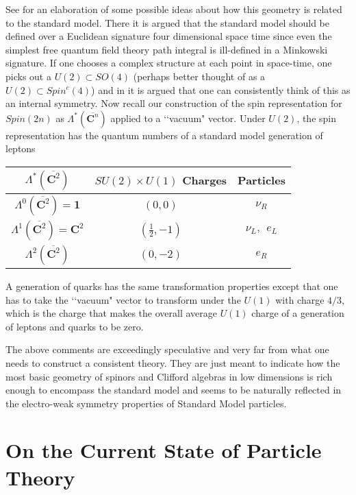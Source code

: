 \documentclass[a4paper,a4paper]{article}
\theoremstyle{conjecture}
\begin{document}
See \cite{Woit1} for an elaboration of some possible ideas about how this geometry
is related to the standard model.  There it is argued that
the standard model should be defined over a Euclidean signature four dimensional
space time since even the simplest free quantum field theory path integral is ill-defined
in a Minkowski signature.  If one chooses a complex structure at each point in space-time,
one picks out a $U(2)\subset SO(4)$ (perhaps better thought of as a $U(2)\subset Spin^c(4)$) 
and in \cite{Woit1} it is argued that one can
consistently think of this as an internal symmetry.  Now recall our construction of
the spin representation for $Spin(2n)$ as $\Lambda^*(\overline {\mathbf C^n})$ applied to a \lq\lq vacuum"
vector.  Under $U(2)$, the spin representation has the quantum numbers of a standard model generation
of leptons

\begin{center}
\begin{tabular}{|c|c|c|}
\hline
$\Lambda^*(\overline{\mathbf C^2})$ & $SU(2)\times U(1)$ Charges& Particles \\
\hline
\hline
$\Lambda^0(\overline{\mathbf C^2})=\mathbf 1$ & $(0,0)$& $\nu_R$\\
\hline
$\Lambda^1(\overline{\mathbf C^2})=\mathbf C^2$ & $(\frac{1}{2},-1)$& $\nu_L,\ \ e_L$\\
\hline
$\Lambda^2(\overline{\mathbf C^2})$ & $(0,-2)$& $e_R$\\
\hline
\end{tabular}
\end{center}

A generation of quarks has the same transformation properties except that one has to take
the \lq\lq vacuum" vector to transform under the $U(1)$ with charge $4/3$, which is the charge
that makes the overall average $U(1)$ charge of a generation of leptons and quarks to be zero.

The above comments are exceedingly speculative and very far from what one needs to
construct a consistent theory.  They are just
meant to indicate how the most basic geometry of spinors and Clifford algebras in low dimensions
is rich enough to encompass the standard model and seems to be naturally reflected in the
electro-weak symmetry properties of Standard Model particles.


\section{On the Current State of Particle Theory}
\end{document}
